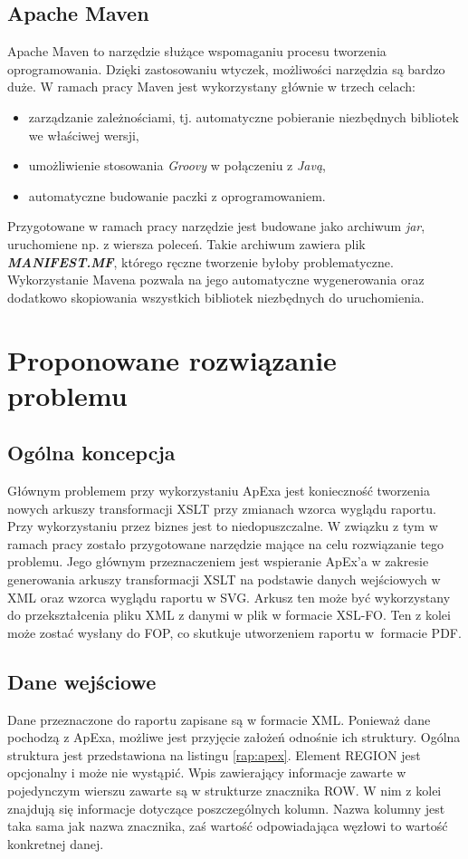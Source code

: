 \documentclass[11pt,a4paper]{article}
\begin{document}
\subsection{Apache Maven} \label{tools:maven}
Apache Maven to narzędzie służące wspomaganiu procesu tworzenia oprogramowania. Dzięki zastosowaniu wtyczek, możliwości narzędzia są bardzo duże. W ramach pracy Maven jest wykorzystany głównie w trzech celach: 
\begin{itemize}
\item zarządzanie zależnościami, tj. automatyczne pobieranie niezbędnych bibliotek we właściwej wersji,
\item umożliwienie stosowania \emph{Groovy} w połączeniu z \emph{Javą},
\item automatyczne budowanie paczki z oprogramowaniem.
\end{itemize} 

Przygotowane w ramach pracy narzędzie jest budowane jako archiwum \emph{jar}, uruchomiene np. z wiersza poleceń. Takie archiwum zawiera plik \textbf{\emph{MANIFEST.MF}}, którego ręczne tworzenie byłoby problematyczne. Wykorzystanie Mavena pozwala na jego automatyczne wygenerowania oraz dodatkowo skopiowania wszystkich bibliotek niezbędnych do uruchomienia. 


\newpage


\section{Proponowane rozwiązanie problemu} \label{sec:solution}
\subsection{Ogólna koncepcja} \label{solution:koncept}
Głównym problemem przy wykorzystaniu ApExa jest konieczność tworzenia nowych arkuszy transformacji XSLT przy zmianach wzorca wyglądu raportu. Przy wykorzystaniu przez biznes jest to niedopuszczalne. W związku z tym w ramach pracy zostało przygotowane narzędzie mające na celu rozwiązanie tego problemu. Jego głównym przeznaczeniem jest wspieranie ApEx'a w zakresie generowania arkuszy transformacji XSLT na podstawie danych wejściowych w XML oraz wzorca wyglądu raportu w SVG. Arkusz ten może być wykorzystany do przekształcenia pliku XML z danymi w plik w formacie XSL-FO. Ten z kolei może zostać wysłany do FOP, co skutkuje utworzeniem raportu w~formacie PDF.

\subsection{Dane wejściowe} \label{solution:data}
Dane przeznaczone do raportu zapisane są w formacie XML. Ponieważ dane pochodzą z ApExa, możliwe jest przyjęcie założeń odnośnie ich struktury. Ogólna struktura jest przedstawiona na listingu \ref{rap:apex}. Element REGION jest opcjonalny i może nie wystąpić. Wpis zawierający informacje zawarte w pojedynczym wierszu zawarte są w strukturze znacznika ROW. W nim z kolei znajdują się informacje dotyczące poszczególnych kolumn. Nazwa kolumny jest taka sama jak nazwa znacznika, zaś wartość odpowiadająca węzłowi to wartość konkretnej danej.
\end{document}
